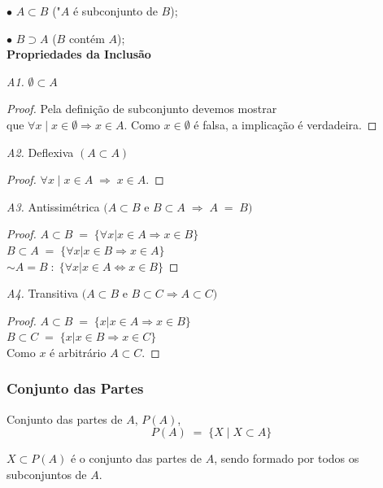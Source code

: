 \noindent
$\bullet$ $A \subset B$ ("$A$ é subconjunto de $B$);

\noindent
$\bullet$ $B \supset A$ ($B$ contém $A$); \\


\noindent
\textbf{Propriedades da Inclusão}


\emph{A1.}  $\emptyset \subset A$

\begin{proof}
	Pela definição de subconjunto devemos mostrar \\ que $\forall x \; | \; x \in \emptyset \Rightarrow x \in A$. Como  $x \in \emptyset$ é falsa, a implicação é verdadeira.
\end{proof}

\emph{A2.}  Deflexiva $( A \subset A)$

\begin{proof}
	$\forall x \; | \; x \in A \; \Rightarrow \; x \in A$.
\end{proof}

\emph{A3.} Antissimétrica $( A \subset B $ e $ B \subset A \; \Rightarrow \; A \; = \; B )$ 

\begin{proof}
	$ A \subset B \; = \; \{ \forall x | x \in A \Rightarrow x \in B \} $ \\
	$ B \subset A \; = \; \{ \forall x | x \in B \Rightarrow x \in A\} $ \\
	$ \sim A = B \; : \; \{ \forall x | x \in A \Leftrightarrow x \in B \} $
	
\end{proof}

\emph{A4.} Transitiva $( A \subset B$ e $ B \subset C \Rightarrow A \subset C )$

\begin{proof}
	$ A \subset B \; = \; \{ x | x \in A \Rightarrow x \in B \} $ \\
	$ B \subset C \; = \; \{ x | x \in B \Rightarrow x \in C \} $ \\
Como $x$ é arbitrário $A \subset C $.
\end{proof} 

\subsubsection{Conjunto das Partes}

\begin{definition}
	Conjunto das partes de $A$, $P(A)$,
	$$P(A) \; = \; \{ X \; | \; X \subset A \}$$ 
	
	$X \subset P(A)$ é o conjunto das partes de $A$, sendo formado por todos os subconjuntos de $A$.
	
\end{definition}

